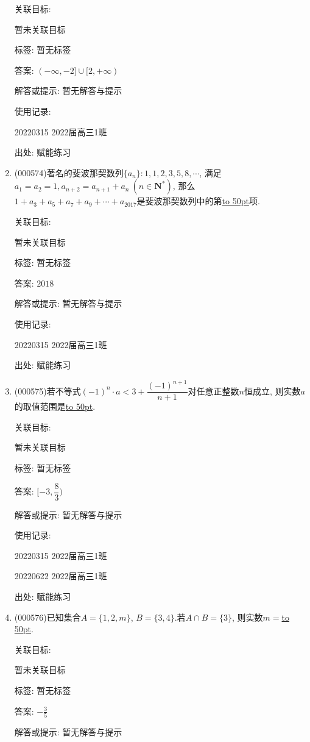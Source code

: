\documentclass[10pt,a4paper]{article}
\newcommand{\blank}[1]{\underline{\hbox to #1pt{}}}
\begin{document}
\begin{enumerate}[1.]
关联目标:

暂未关联目标



标签: 暂无标签

答案: $(-\infty ,-2]\cup [2,+\infty)$

解答或提示: 暂无解答与提示

使用记录:

20220315	2022届高三1班	


出处: 赋能练习
\item { (000574)}著名的斐波那契数列$\{a_n\}:1,1,2,3,5,8,\cdots$, 满足$a_1=a_2=1,a_{n+2}=a_{n+1}+a_n \ (n\in \mathbf{N}^*)$, 那么$1+a_3+a_5+a_7+a_9+\cdots+a_{2017}$是斐波那契数列中的第\blank{50}项.


关联目标:

暂未关联目标



标签: 暂无标签

答案: $2018$

解答或提示: 暂无解答与提示

使用记录:

20220315	2022届高三1班	


出处: 赋能练习
\item { (000575)}若不等式$(-1)^n\cdot a<3+\dfrac{(-1)^{n+1}}{n+1}$对任意正整数$n$恒成立, 则实数$a$的取值范围是\blank{50}.


关联目标:

暂未关联目标



标签: 暂无标签

答案: $[-3,\dfrac 83)$

解答或提示: 暂无解答与提示

使用记录:

20220315	2022届高三1班	

20220622	2022届高三1班  	


出处: 赋能练习
\item { (000576)}已知集合$A=\{1,2,m\}$, $B=\{3,4\}$.若$A\cap B=\{3\}$, 则实数$m=$\blank{50}.


关联目标:

暂未关联目标



标签: 暂无标签

答案: $-\frac 35$

解答或提示: 暂无解答与提示


\end{enumerate}
\end{document}
